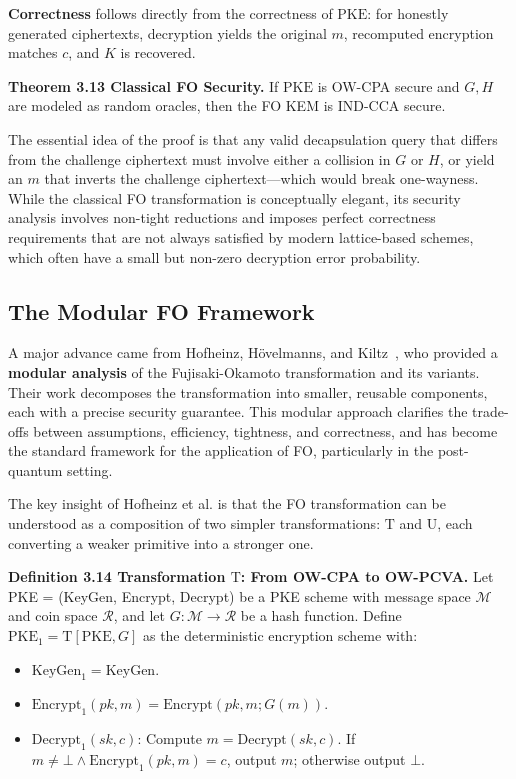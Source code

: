 \noindent\textbf{Correctness} follows directly from the correctness of $\text{PKE}$: for honestly generated ciphertexts, decryption yields the original $m$, recomputed encryption matches $c$, and $K$ is recovered.

\noindent\textbf{Theorem 3.13 Classical FO Security.} If $\text{PKE}$ is OW-CPA secure and $G, H$ are modeled as random oracles, then the FO KEM is IND-CCA secure.

The essential idea of the proof is that any valid decapsulation query that differs from the challenge ciphertext must involve either a collision in $G$ or $H$, or yield an $m$ that inverts the challenge ciphertext---which would break one-wayness. While the classical FO transformation is conceptually elegant, its security analysis involves non-tight reductions and imposes perfect correctness requirements that are not always satisfied by modern lattice-based schemes, which often have a small but non-zero decryption error probability.

\subsection{The Modular FO Framework}

A major advance came from Hofheinz, Hövelmanns, and Kiltz~\cite{hofheinz2017modular}, who provided a \textbf{modular analysis} of the Fujisaki-Okamoto transformation and its variants. Their work decomposes the transformation into smaller, reusable components, each with a precise security guarantee. This modular approach clarifies the trade-offs between assumptions, efficiency, tightness, and correctness, and has become the standard framework for the application of FO, particularly in the post-quantum setting.

The key insight of Hofheinz et al. is that the FO transformation can be understood as a composition of two simpler transformations: $\text{T}$ and $\text{U}$, each converting a weaker primitive into a stronger one.

\noindent\textbf{Definition 3.14 Transformation $\text{T}$: From OW-CPA to OW-PCVA.} Let PKE = (KeyGen, Encrypt, Decrypt) be a PKE scheme with message space $\mathcal{M}$ and coin space $\mathcal{R}$, and let $G: \mathcal{M} \to \mathcal{R}$ be a hash function. Define $\text{PKE}_1 = \text{T}[\text{PKE}, G]$ as the deterministic encryption scheme with:
\begin{itemize}
    \item $\text{KeyGen}_1 = \text{KeyGen}$.
    \item $\text{Encrypt}_1(pk, m) = \text{Encrypt}(pk, m; G(m))$.
    \item $\text{Decrypt}_1(sk, c)$: Compute $m = \text{Decrypt}(sk, c)$. If $m \ne \bot \wedge \text{Encrypt}_1(pk, m) = c$, output $m$; otherwise output $\bot$.
\end{itemize}

